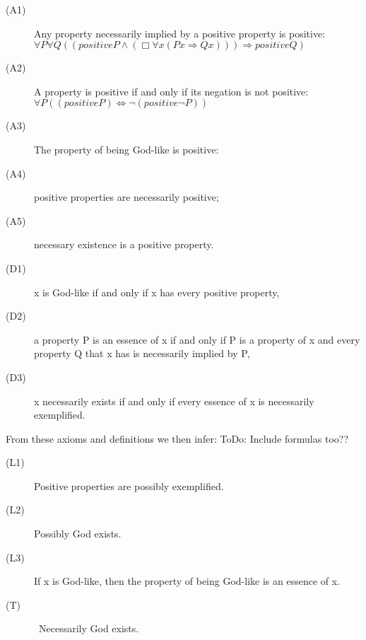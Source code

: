 \documentclass{llncs}
\begin{document}
\begin{description}
\item[(A1)] Any property necessarily implied by a positive property is positive: \\
       $\forall P \forall Q ((positive P \wedge (\Box \forall x (P x \Rightarrow Q x))) \Rightarrow positive Q)$
\item[(A2)] A property is positive if and only if its negation is not positive:\\
       $\forall P ((positive P) \Leftrightarrow \neg (positive \neg P))$ 
\item[(A3)] The property of being God-like is positive:
      
\item[(A4)] positive properties are necessarily positive; 
\item[(A5)] necessary existence is a positive property.
\item[(D1)] x is God-like if and only if x has every positive property, 
\item[(D2)] a property P is an essence of x if and only if P is a property of x and every property Q that x has is necessarily implied by P, 
\item[(D3)] x necessarily exists if and only if every essence of x is necessarily exemplified.
\end{description}

\noindent
From these axioms and definitions we then infer:
%
ToDo: Include formulas too??
\begin{description}
\item[(L1)] Positive properties are possibly exemplified.
\item[(L2)] Possibly God exists.
\item[(L3)] If x is God-like, then the property of being 
God-like is an essence of x.
\item[(T)] \ Necessarily God exists.
\end{description}

\end{document}
